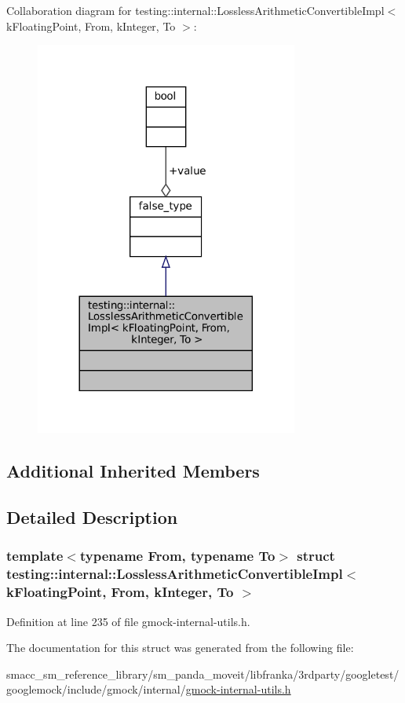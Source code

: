 Collaboration diagram for testing\+:\+:internal\+:\+:Lossless\+Arithmetic\+Convertible\+Impl$<$ k\+Floating\+Point, From, k\+Integer, To $>$\+:
\nopagebreak
\begin{figure}[H]
\begin{center}
\leavevmode
\includegraphics[width=245pt]{structtesting_1_1internal_1_1LosslessArithmeticConvertibleImpl_3_01kFloatingPoint_00_01From_00_0efe90b7ed8a5814977dde04f281d5e84}
\end{center}
\end{figure}
\subsection*{Additional Inherited Members}


\subsection{Detailed Description}
\subsubsection*{template$<$typename From, typename To$>$\newline
struct testing\+::internal\+::\+Lossless\+Arithmetic\+Convertible\+Impl$<$ k\+Floating\+Point, From, k\+Integer, To $>$}



Definition at line 235 of file gmock-\/internal-\/utils.\+h.



The documentation for this struct was generated from the following file\+:\begin{DoxyCompactItemize}
\item 
smacc\+\_\+sm\+\_\+reference\+\_\+library/sm\+\_\+panda\+\_\+moveit/libfranka/3rdparty/googletest/googlemock/include/gmock/internal/\hyperlink{gmock-internal-utils_8h}{gmock-\/internal-\/utils.\+h}\end{DoxyCompactItemize}
